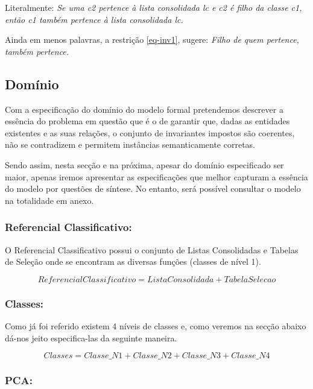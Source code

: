 \documentclass[tikz,runningheads,a4paper]{llncs}
\begin{document}
\noindent Literalmente:
\vskip0.2cm
\textit{Se uma c2 pertence à lista consolidada lc e c2 é filho da classe c1, então c1 também pertence à lista consolidada lc.}

\vskip0.2cm
\noindent Ainda em menos palavras, a restrição \eqref{eq-inv1}, sugere:
\vskip0.2cm
\textit{Filho de quem pertence, também pertence.}

\subsection{Domínio}

Com a especificação do domínio do modelo formal pretendemos descrever a essência do problema em questão que é o de garantir que, dadas as entidades existentes e as suas relações, o conjunto de invariantes impostos são coerentes, não se contradizem e permitem instâncias semanticamente corretas.

Sendo assim, nesta secção e na próxima, apesar do domínio especificado ser maior, apenas iremos apresentar as especificações que melhor capturam a essência do modelo por questões de síntese. No entanto, será possível consultar o modelo na totalidade em anexo.

\subsubsection{Referencial Classificativo:}

O Referencial Classificativo possui o conjunto de Listas Consolidadas e Tabelas de Seleção onde se encontram as diversas funções (classes de nível 1).

\begin{equation*}
    ReferencialClassificativo = ListaConsolidada + TabelaSelecao
\end{equation*}

\subsubsection{Classes:}

Como já foi referido existem 4 níveis de classes e, como veremos na secção abaixo dá-nos jeito especifica-las da seguinte maneira.

\begin{equation*}
    Classes = Classe\_N1 + Classe\_N2 + Classe\_N3 + Classe\_N4
\end{equation*}

\subsubsection{PCA:}
\end{document}

